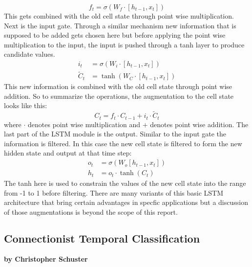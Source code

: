 \documentclass{article}
\begin{document}
\[
f_t = \sigma(W_f\cdot[h_{t-1}, x_t])
\]
This gets combined with the old cell state through point wise multiplication.
Next is the input gate. Through a similar mechanism new information that is supposed to be added gets chosen here but before applying the point wise multiplication to the input, the input is pushed through a tanh layer to produce candidate values. 
\[
\begin{split}
i_t &= \sigma(W_i\cdot[h_{t-1}, x_t])\\
\tilde{C}_t &= \tanh(W_C\cdot[h_{t-1},x_t])
\end{split}
\]
This new information is combined with the old cell state through point wise addition. So to summarize the operations, the augmentation to the cell state looks like this:
\[
C_t = f_t\cdot C_{t-1}+i_t\cdot \tilde{C}_t
\]
where \(\cdot\) denotes point wise multiplication and \(+\) denotes point wise addition. The last part of the LSTM module is the output. Similar to the input gate the information is filtered. In this case the new cell state is filtered to form the new hidden state and output at that time step:
\[
\begin{split}
o_t &= \sigma(W_o[h_{t-1}, x_t])\\
h_t &= o_t\cdot\tanh(C_t)
\end{split}
\]
The tanh here is used to constrain the values of the new cell state into the range from -1 to 1 before filtering. There are many variants of this basic LSTM architecture that bring certain advantages in specfic applications but a discussion of those augmentations is beyond the scope of this report.

\subsection{Connectionist Temporal Classification}

\textbf{by Christopher Schuster} \\
\end{document}
